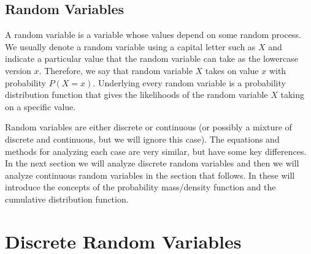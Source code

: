 %
%
%

\subsection{Random Variables}

A random variable is a variable whose values depend on some random process. We usually denote a random variable using a capital letter such as $X$ and indicate a particular value that the random variable can take as the lowercase version $x$. Therefore, we say that random variable $X$ takes on value $x$ with probability $P(X = x)$. Underlying every random variable is a probability distribution function that gives the likelihoods of the random variable $X$ taking on a specific value.

Random variables are either discrete or continuous (or possibly a mixture of discrete and continuous, but we will ignore this case). The equations and methods for analyzing each case are very similar, but have some key differences. In the next section we will analyze discrete random variables and then we will analyze continuous random variables in the section that follows. In these will introduce the concepts of the probability mass/density function and the cumulative distribution function.

\section{Discrete Random Variables}

